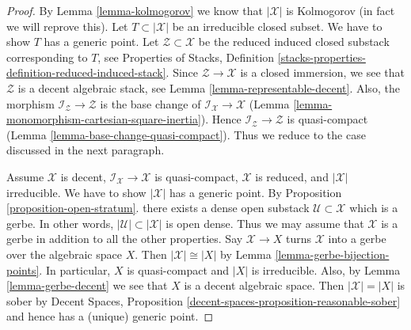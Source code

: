 \documentclass[10pt,a4paper]{amsart}
\theoremstyle{plain}
\theoremstyle{definition}
\theoremstyle{remark}
\numberwithin{equation}{subsection}
\begin{document}
\begin{proof}
By Lemma \ref{lemma-kolmogorov} we know that $|\mathcal{X}|$ is Kolmogorov
(in fact we will reprove this).
Let $T \subset |\mathcal{X}|$ be an irreducible closed subset.
We have to show $T$ has a generic point.
Let $\mathcal{Z} \subset \mathcal{X}$ be the reduced induced
closed substack corresponding to $T$, see Properties of Stacks, Definition
\ref{stacks-properties-definition-reduced-induced-stack}.
Since $\mathcal{Z} \to \mathcal{X}$ is a closed immersion,
we see that $\mathcal{Z}$ is a decent algebraic stack, see
Lemma \ref{lemma-representable-decent}.
Also, the morphism $\mathcal{I}_\mathcal{Z} \to \mathcal{Z}$
is the base change of $\mathcal{I}_\mathcal{X} \to \mathcal{X}$
(Lemma \ref{lemma-monomorphism-cartesian-square-inertia}).
Hence $\mathcal{I}_\mathcal{Z} \to \mathcal{Z}$ is quasi-compact
(Lemma \ref{lemma-base-change-quasi-compact}).
Thus we reduce to the case discussed in the next paragraph.

\medskip\noindent
Assume $\mathcal{X}$ is decent,
$\mathcal{I}_\mathcal{X} \to \mathcal{X}$ is quasi-compact,
$\mathcal{X}$ is reduced, and $|\mathcal{X}|$ irreducible.
We have to show $|\mathcal{X}|$ has a generic point.
By Proposition \ref{proposition-open-stratum}.
there exists a dense open substack $\mathcal{U} \subset \mathcal{X}$
which is a gerbe. In other words, $|\mathcal{U}| \subset |\mathcal{X}|$
is open dense. Thus we may assume that $\mathcal{X}$ is a gerbe
in addition to all the other properties.
Say $\mathcal{X} \to X$ turns $\mathcal{X}$ into a gerbe over the
algebraic space $X$. Then $|\mathcal{X}| \cong |X|$ by
Lemma \ref{lemma-gerbe-bijection-points}.
In particular, $X$ is quasi-compact and $|X|$ is irreducible.
Also, by Lemma \ref{lemma-gerbe-decent}
we see that $X$ is a decent algebraic space.
Then $|\mathcal{X}| = |X|$ is sober by
Decent Spaces, Proposition \ref{decent-spaces-proposition-reasonable-sober}
and hence has a (unique) generic point.
\end{proof}
\end{document}
